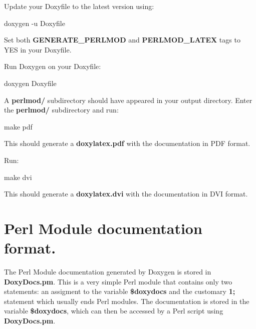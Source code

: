 \begin{DoxyEnumerate}
\item Update your Doxyfile to the latest version using:


\begin{DoxyPre}doxygen -u Doxyfile\end{DoxyPre}



\item Set both {\bfseries GENERATE\_\-PERLMOD} and {\bfseries PERLMOD\_\-LATEX} tags to YES in your Doxyfile.


\item Run Doxygen on your Doxyfile:


\begin{DoxyPre}doxygen Doxyfile\end{DoxyPre}



\item A {\bfseries perlmod/} subdirectory should have appeared in your output directory. Enter the {\bfseries perlmod/} subdirectory and run:


\begin{DoxyPre}make pdf\end{DoxyPre}




This should generate a {\bfseries doxylatex.pdf} with the documentation in PDF format.


\item Run:


\begin{DoxyPre}make dvi\end{DoxyPre}




This should generate a {\bfseries doxylatex.dvi} with the documentation in DVI format.


\end{DoxyEnumerate}\hypertarget{perlmod_doxydocs_format}{}\section{Perl Module documentation format.}\label{perlmod_doxydocs_format}
The Perl Module documentation generated by Doxygen is stored in {\bfseries DoxyDocs.pm}. This is a very simple Perl module that contains only two statements: an assigment to the variable {\bfseries \$doxydocs} and the customary {\bfseries 1;} statement which usually ends Perl modules. The documentation is stored in the variable {\bfseries \$doxydocs}, which can then be accessed by a Perl script using {\bfseries DoxyDocs.pm}.

